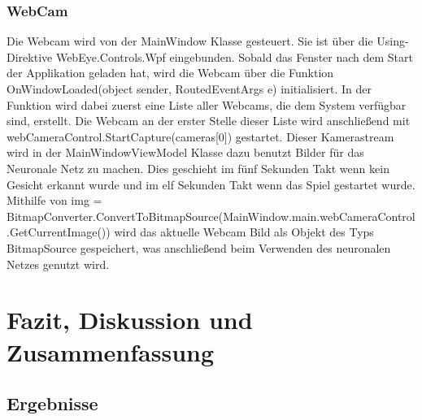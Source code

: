 \documentclass[12pt,a4paper,headinclude,twoside, plainheadsepline, open=right,numbers=noenddot]{scrreprt}
\begin{document}
\subsection{WebCam}
Die Webcam wird von der MainWindow Klasse gesteuert. Sie ist über die Using-Direktive WebEye.Controls.Wpf eingebunden.   Sobald das Fenster nach dem Start der Applikation geladen hat, wird die Webcam über die Funktion
 OnWindowLoaded(object sender, RoutedEventArgs e) initialisiert. In der Funktion wird dabei zuerst eine Liste aller Webcams, die dem System verfügbar sind, erstellt.  Die Webcam an der erster Stelle dieser Liste wird anschließend mit webCameraControl.StartCapture(cameras[0]) 	gestartet. Dieser Kamerastream wird in der MainWindowViewModel Klasse dazu benutzt Bilder für das Neuronale Netz zu machen. Dies geschieht im fünf Sekunden Takt wenn kein Gesicht erkannt wurde und im elf Sekunden Takt wenn das Spiel gestartet wurde. Mithilfe von img = BitmapConverter.ConvertToBitmapSource(MainWindow.main.webCameraControl.GetCurrentImage()) wird das aktuelle Webcam Bild 
als Objekt des Typs BitmapSource gespeichert, was anschließend beim Verwenden des neuronalen Netzes genutzt wird.


\chapter{Fazit, Diskussion und Zusammenfassung}
\section{Ergebnisse}
\end{document}
